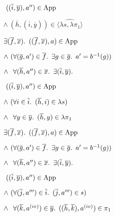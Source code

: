 \begin{itemize}
  \step
    \quad\quad\quad\phantom{$\land$}$~((\overline{i},\overline{y}),a^{\prime\prime})\in\operatorname{App}$

  \step
    \quad\quad\quad$\land~(\overline{h},(\overline{i},\overline{y}))\in\widehat{\langle\lambda s,\lambda\pi_1\rangle}$
  \addtolength{\itemsep}{.5\baselineskip}

  \step[\iffs]
    $\exists (\overline{f},\overline{x})\ldotp~((\overline{f},\overline{x}),a)\in\operatorname{App}$

  \addtolength{\itemsep}{-.5\baselineskip}
  \step
    \quad $\land~(\forall (\overline{g},a^\prime)\in\overline{f}\ldotp~\exists g\in\overline{g}\ldotp~a^\prime = b^{-1}(g))$

  \step
    \quad $\land~\phantom{(}\forall(\overline{h},a^{\prime\prime})\in\overline{x}\ldotp~\exists(\overline{i},\overline{y})\ldotp$

  \step
    \quad\quad\quad\phantom{$\land$}$~((\overline{i},\overline{y}),a^{\prime\prime})\in\operatorname{App}$

  \step
    \quad\quad\quad$\land~(\forall i\in\overline{i}\ldotp~(\overline{h},i)\in\lambda s)$

  \step
    \quad\quad\quad$\land~\phantom{(}\forall y\in\overline{y}\ldotp~(\overline{h},y)\in\lambda\pi_1$
  \addtolength{\itemsep}{.5\baselineskip}

  \step[\iffs]
    $\exists (\overline{f},\overline{x})\ldotp~((\overline{f},\overline{x}),a)\in\operatorname{App}$

  \addtolength{\itemsep}{-.5\baselineskip}
  \step
    \quad $\land~(\forall (\overline{g},a^\prime)\in\overline{f}\ldotp~\exists g\in\overline{g}\ldotp~a^\prime = b^{-1}(g))$

  \step
    \quad $\land~\phantom{(}\forall(\overline{h},a^{\prime\prime})\in\overline{x}\ldotp~\exists(\overline{i},\overline{y})\ldotp$

  \step
    \quad\quad\quad\phantom{$\land$}$~((\overline{i},\overline{y}),a^{\prime\prime})\in\operatorname{App}$

  \step
    \quad\quad\quad$\land~(\forall (\overline{j},a^{\prime\prime\prime})\in\overline{i}\ldotp~(\overline{j},a^{\prime\prime\prime})\in s)$
    \marginnote{\Def-$\lambda\cdot$}

  \step
    \quad\quad\quad$\land~\phantom{(}\forall (\overline{k},a^{\text (iv)})\in\overline{y}\ldotp~((\overline{h}, \overline{k}),a^{\text (iv)})\in\pi_1$
    \marginnote{\Def-$\lambda\cdot$}
  \addtolength{\itemsep}{.5\baselineskip}


\end{itemize}
